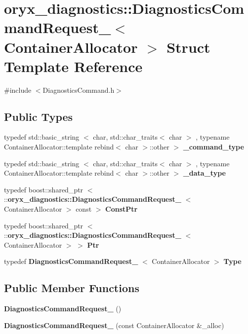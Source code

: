 \section{oryx\-\_\-diagnostics\-:\-:\-Diagnostics\-Command\-Request\-\_\-$<$ \-Container\-Allocator $>$ \-Struct \-Template \-Reference}
\label{structoryx__diagnostics_1_1DiagnosticsCommandRequest__}


{\ttfamily \#include $<$\-Diagnostics\-Command.\-h$>$}

\subsection*{\-Public \-Types}
\begin{DoxyCompactItemize}
\item 
typedef std\-::basic\-\_\-string\*
$<$ char, std\-::char\-\_\-traits$<$ char $>$\*
, typename \*
\-Container\-Allocator\-::template \*
rebind$<$ char $>$\-::other $>$ {\bf \-\_\-command\-\_\-type}
\item 
typedef std\-::basic\-\_\-string\*
$<$ char, std\-::char\-\_\-traits$<$ char $>$\*
, typename \*
\-Container\-Allocator\-::template \*
rebind$<$ char $>$\-::other $>$ {\bf \-\_\-data\-\_\-type}
\item 
typedef boost\-::shared\-\_\-ptr\*
$<$ \-::{\bf oryx\-\_\-diagnostics\-::\-Diagnostics\-Command\-Request\-\_\-}\*
$<$ \-Container\-Allocator $>$ const  $>$ {\bf \-Const\-Ptr}
\item 
typedef boost\-::shared\-\_\-ptr\*
$<$ \-::{\bf oryx\-\_\-diagnostics\-::\-Diagnostics\-Command\-Request\-\_\-}\*
$<$ \-Container\-Allocator $>$ $>$ {\bf \-Ptr}
\item 
typedef \*
{\bf \-Diagnostics\-Command\-Request\-\_\-}\*
$<$ \-Container\-Allocator $>$ {\bf \-Type}
\end{DoxyCompactItemize}
\subsection*{\-Public \-Member \-Functions}
\begin{DoxyCompactItemize}
\item 
{\bf \-Diagnostics\-Command\-Request\-\_\-} ()
\item 
{\bf \-Diagnostics\-Command\-Request\-\_\-} (const \-Container\-Allocator \&\-\_\-alloc)
\end{DoxyCompactItemize}
